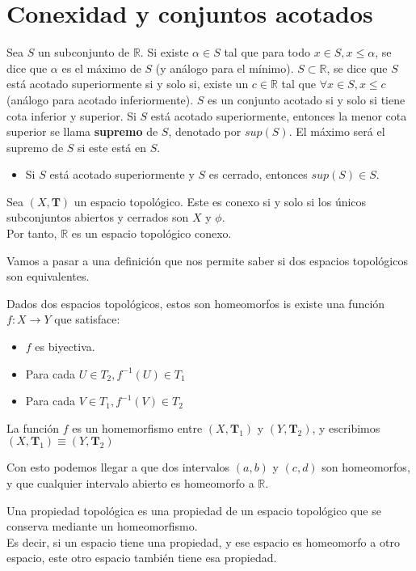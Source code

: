 \documentclass{../Topologia.tex}
\begin{document}
\section{Conexidad y conjuntos acotados}
Sea $S$ un subconjunto de $\mathbb{R}$. Si existe $\alpha \in S$ tal que para todo $x \in S, x \leq \alpha$, se dice que $\alpha$ es el máximo de $S$ (y análogo para el mínimo). $S \subset \mathbb{R}$, se dice que $S$ está acotado superiormente si y solo si, existe un $c \in \mathbb{R}$ tal que $\forall x \in S, x \leq c$ (análogo para acotado inferiormente).
$S$ es un conjunto acotado si y solo si tiene cota inferior y superior.
Si $S$ está acotado superiormente, entonces la menor cota superior se llama \textbf{supremo} de $S$, denotado por $sup(S)$. El máximo será el supremo de $S$ si este está en $S$.

\begin{itemize}
    \item Si $S$ está acotado superiormente y $S$ es cerrado, entonces $sup(S) \in S$.
\end{itemize}
\begin{defin}

	Sea $(X,\mathbf{T})$ un espacio topológico. Este es conexo si y solo si los únicos subconjuntos abiertos y cerrados son $X$ y $\phi$.\\
	Por tanto, $\mathbb{R}$ es un espacio topológico conexo. 

\end{defin}
Vamos a pasar a una definición que nos permite saber si dos espacios topológicos son equivalentes.
\begin{defin}
	Dados dos espacios topológicos, estos son homeomorfos is existe una función $f:X \to Y$ que satisface:
	\begin{itemize}
		\item $f$ es biyectiva.
		\item Para cada $U \in T_{2}, f ^{-1}(U) \in T_{1}$
		\item Para cada $V \in T_{1}, f^{-1}(V) \in T_{2}$ 
	\end{itemize}
	La función $f$ es un homemorfismo entre $(X,\mathbf{T}_{1})$ y $(Y, \mathbf{T}_{2})$, y escribimos $(X,\mathbf{T}_{1}) \equiv (Y,\mathbf{T}_{2})$    
\end{defin}
Con esto podemos llegar a que dos intervalos $(a,b)$ y $(c,d)$ son homeomorfos, y que cualquier intervalo abierto es homeomorfo a $\mathbb{R}$.
\begin{defin}
	
	Una propiedad topológica es una propiedad de un espacio topológico que se conserva mediante un homeomorfismo.\\
	Es decir, si un espacio tiene una propiedad, y ese espacio es homeomorfo a otro espacio, este otro espacio también tiene esa propiedad.

\end{defin}
\end{document}
